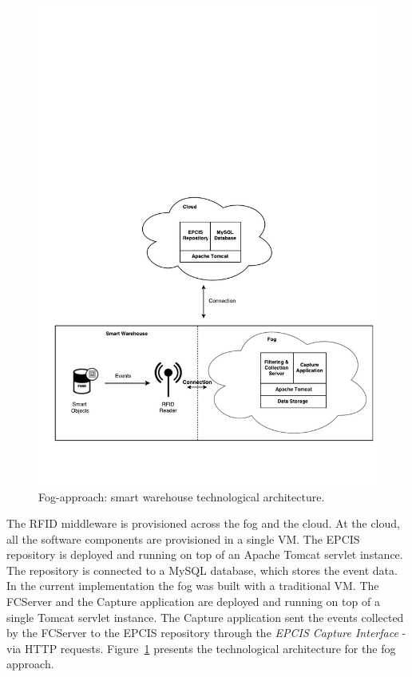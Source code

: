 \begin{figure}
  \centering
  \includegraphics[width=\textwidth]{./images/implementation_fog_architecture}
  \caption[Fog-approach: technological architecture.]{Fog-approach: smart warehouse technological architecture.}
  \label{fig:implementation_fog_architecture}
\end{figure}

The \gls{RFID} middleware is provisioned across the fog and the cloud. At the cloud,
all the software components are provisioned in a single \gls{VM}. The \gls{EPCIS} repository is deployed
and running on top of an Apache Tomcat servlet instance. The repository is connected to a MySQL
database, which stores the event data. In the current implementation the fog was built with a traditional
\gls{VM}. The \gls{FCServer} and the Capture application are deployed and running on top of a single
Tomcat servlet instance. The Capture application sent the events collected by the \gls{FCServer} to
the \gls{EPCIS} repository through the \textit{\gls{EPCIS} Capture Interface} - via \gls{HTTP} requests.
Figure~\ref{fig:implementation_fog_architecture} presents the technological architecture for the fog
approach.\\

